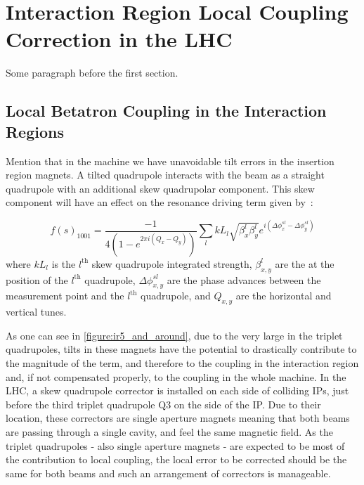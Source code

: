 \chapter{Interaction Region Local Coupling Correction in the LHC} %
\label{chapter:IR_Local_Coupling} %

Some paragraph before the first section.


\section{Local Betatron Coupling in the Interaction Regions}


Mention that in the machine we have unavoidable tilt errors in the insertion region magnets.
A tilted quadrupole interacts with the beam as a straight quadrupole with an additional skew quadrupolar component.
This skew component will have an effect on the \foneohone resonance driving term given by~\cite{PRAB:Calaga:Coupling_Merging_Hamiltonian_Matrix_Approaches}:

\begin{equation}
    f(s)_{1001} = \frac{-1}{4 \left(1 - e^{2 \pi i \left(Q_x - Q_y \right)}\right)} \sum_l k L_l \sqrt{\beta_x^l \beta_y^l} e^{i \left(\Delta \phi_x^{s l} - \Delta \phi_y^{s l}\right)}
    \label{equation:skew_quad_contribution_to_f1001}
\end{equation}
where \(k L_l\) is the \(l^{\mathrm{th}}\) skew quadrupole integrated strength, \(\beta^l_{x,y}\) are the \betafunctions at the position of the \(l^{\mathrm{th}}\) quadrupole, \(\Delta \phi^{sl}_{x,y}\) are the phase advances between the measurement point and the \(l^{\mathrm{th}}\) quadrupole, and \(Q_{x,y}\) are the horizontal and vertical tunes.

As one can see in \cref{figure:ir5_and_around}, due to the very large \betafunctions in the triplet quadrupoles, tilts in these magnets have the potential to drastically contribute to the magnitude of the \foneohone term, and therefore to the coupling in the interaction region and, if not compensated properly, to the coupling in the whole machine.
In the LHC, a skew quadrupole corrector is installed on each side of colliding IPs, just before the third triplet quadrupole \(\mathrm{Q3}\) on the side of the IP.
Due to their location, these correctors are single aperture magnets meaning that both beams are passing through a single cavity, and feel the same magnetic field.
As the triplet quadrupoles - also single aperture magnets - are expected to be most of the contribution to local coupling, the local error to be corrected should be the same for both beams and such an arrangement of correctors is manageable.

